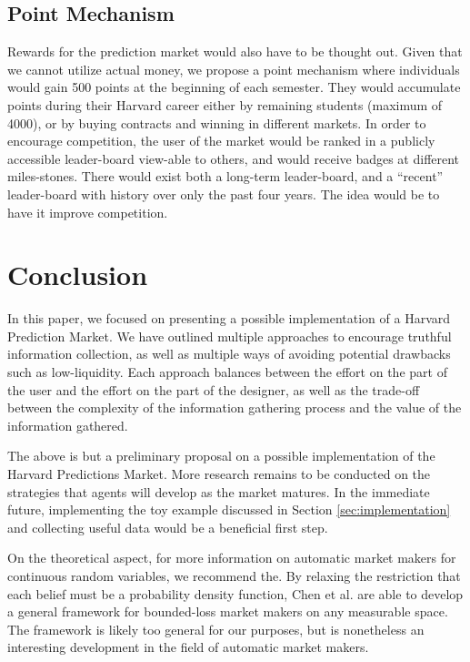 \subsection{Point Mechanism}
Rewards for the prediction market would also have to be thought out. Given that we cannot utilize actual money, we propose a point mechanism where individuals would gain 500 points at the beginning of each semester. They would accumulate points during their Harvard career either by remaining students (maximum of 4000), or by buying contracts and winning in different markets. In order to encourage competition, the user of the market would be ranked in a publicly accessible leader-board view-able to others, and would receive badges at different miles-stones. There would exist both a long-term leader-board, and a ``recent'' leader-board with history over only the past four years. The idea would be to have it improve competition.


\section{Conclusion}
In this paper, we focused on presenting a possible implementation of a Harvard Prediction Market. We have outlined multiple approaches to encourage truthful information collection, as well as multiple ways of avoiding potential drawbacks such as low-liquidity. Each approach balances between the effort on the part of the user and the effort on the part of the designer, as well as the trade-off between the complexity of the information gathering process and the value of the information gathered. 

The above is but a preliminary proposal on a possible implementation of the Harvard Predictions Market. More research remains to be conducted on the strategies that agents will develop as the market matures. In the immediate future, implementing the toy example discussed in Section \ref{sec:implementation} and collecting useful data would be a beneficial first step. 

On the theoretical aspect, for more information on automatic market makers for continuous random variables, we recommend the. By relaxing the restriction that each belief must be a probability density function, Chen et al. \cite{cost_based} are able to develop a general framework for bounded-loss market makers on any measurable space. The framework is likely too general for our purposes, but is nonetheless an interesting development in the field of automatic market makers. 

\printbibliography
